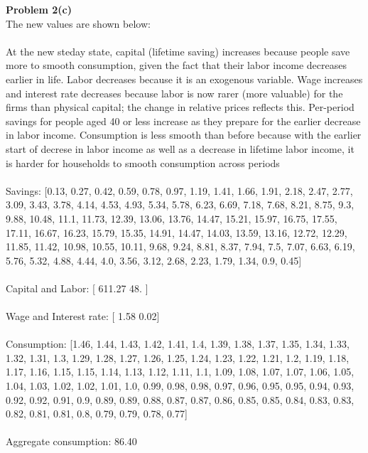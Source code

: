 \documentclass[letterpaper,12pt]{article}
\theoremstyle{definition}
\begin{document}
\noindent\textbf{Problem 2(c)}\\
The new values are shown below:\\
\\
At the new steday state, capital (lifetime saving) increases because people save more to smooth consumption, given the fact that their labor income decreases earlier in life. Labor decreases because it is an exogenous variable. Wage increases and interest rate decreases because labor is now rarer (more valuable) for the firms than physical capital; the change in relative prices reflects this. Per-period savings for people aged 40 or less increase as they prepare for the earlier decrease in labor income. Consumption is less smooth than before because with the earlier start of decrese in labor income as well as a decrease in lifetime labor income, it is harder for households to smooth consumption across periods\\
\\
Savings: 			 [0.13, 0.27, 0.42, 0.59, 0.78, 0.97, 1.19, 1.41, 1.66, 1.91, 2.18, 2.47, 2.77, 3.09, 3.43, 3.78, 4.14, 4.53, 4.93, 5.34, 5.78, 6.23, 6.69, 7.18, 7.68, 8.21, 8.75, 9.3, 9.88, 10.48, 11.1, 11.73, 12.39, 13.06, 13.76, 14.47, 15.21, 15.97, 16.75, 17.55, 17.11, 16.67, 16.23, 15.79, 15.35, 14.91, 14.47, 14.03, 13.59, 13.16, 12.72, 12.29, 11.85, 11.42, 10.98, 10.55, 10.11, 9.68, 9.24, 8.81, 8.37, 7.94, 7.5, 7.07, 6.63, 6.19, 5.76, 5.32, 4.88, 4.44, 4.0, 3.56, 3.12, 2.68, 2.23, 1.79, 1.34, 0.9, 0.45] \\
\\
 Capital and Labor: 		 [ 611.27   48.  ] \\
 \\
 Wage and Interest rate: 	 [ 1.58  0.02] \\
 \\
 Consumption: 			 [1.46, 1.44, 1.43, 1.42, 1.41, 1.4, 1.39, 1.38, 1.37, 1.35, 1.34, 1.33, 1.32, 1.31, 1.3, 1.29, 1.28, 1.27, 1.26, 1.25, 1.24, 1.23, 1.22, 1.21, 1.2, 1.19, 1.18, 1.17, 1.16, 1.15, 1.15, 1.14, 1.13, 1.12, 1.11, 1.1, 1.09, 1.08, 1.07, 1.07, 1.06, 1.05, 1.04, 1.03, 1.02, 1.02, 1.01, 1.0, 0.99, 0.98, 0.98, 0.97, 0.96, 0.95, 0.95, 0.94, 0.93, 0.92, 0.92, 0.91, 0.9, 0.89, 0.89, 0.88, 0.87, 0.87, 0.86, 0.85, 0.85, 0.84, 0.83, 0.83, 0.82, 0.81, 0.81, 0.8, 0.79, 0.79, 0.78, 0.77]\\
\\
Aggregate consumption: 86.40\\
\\
\end{document}
